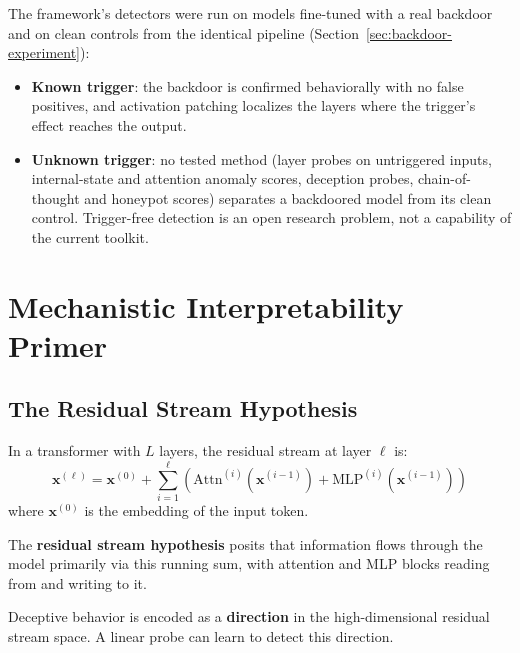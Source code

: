 \documentclass[11pt,letterpaper]{article}
\let\origsubsection\subsection
\renewcommand{\subsection}{\needspace{8\baselineskip}\origsubsection}}
\begin{document}
\begin{keyconceptbox}
The framework's detectors were run on models fine-tuned with a real backdoor and on clean controls from the identical pipeline (Section~\ref{sec:backdoor-experiment}):
\begin{itemize}[nosep]
  \item \textbf{Known trigger}: the backdoor is confirmed behaviorally with no false positives, and activation patching localizes the layers where the trigger's effect reaches the output.
  \item \textbf{Unknown trigger}: no tested method (layer probes on untriggered inputs, internal-state and attention anomaly scores, deception probes, chain-of-thought and honeypot scores) separates a backdoored model from its clean control. Trigger-free detection is an open research problem, not a capability of the current toolkit.
\end{itemize}
\end{keyconceptbox}

\section{Mechanistic Interpretability Primer}
\label{sec:primer}

\subsection{The Residual Stream Hypothesis}

\begin{mathbox}
In a transformer with $L$ layers, the residual stream at layer $\ell$ is:
\[
\mathbf{x}^{(\ell)} = \mathbf{x}^{(0)} + \sum_{i=1}^{\ell} \left( \text{Attn}^{(i)}(\mathbf{x}^{(i-1)}) + \text{MLP}^{(i)}(\mathbf{x}^{(i-1)}) \right)
\]
where $\mathbf{x}^{(0)}$ is the embedding of the input token.
\end{mathbox}

The \textbf{residual stream hypothesis} posits that information flows through the model primarily via this running sum, with attention and MLP blocks reading from and writing to it.

\begin{keyconceptbox}
Deceptive behavior is encoded as a \textbf{direction} in the high-dimensional residual stream space. A linear probe can learn to detect this direction.
\end{keyconceptbox}
\end{document}
